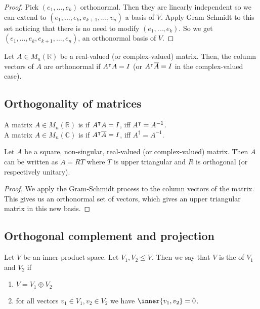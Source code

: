 \begin{proof}
	Pick $(e_1, \dots, e_k)$ orthonormal.
	Then they are linearly independent so we can extend to $(e_1, \dots, e_k, v_{k+1}, \dots, v_n)$ a basis of $V$.
	Apply Gram Schmidt to this set noticing that there is no need to modify $(e_1, \dots, e_k)$.
	So we get $(e_1, \dots, e_k, e_{k+1}, \dots, e_n)$, an orthonormal basis of $V$.
\end{proof} 

\begin{remark}
	Let $A \in M_n(\mathbb R)$ be a real-valued (or complex-valued) matrix.
	Then, the column vectors of $A$ are orthonormal if $A^\intercal A = I$ (or $A^\intercal \overline A = I$ in the complex-valued case).
\end{remark}

\subsection{Orthogonality of matrices}
\begin{definition}
	A matrix $A \in M_n(\mathbb R)$ is  if $A^\intercal A = I$, iff $A^\intercal = A^{-1}$. \\
	A matrix $A \in M_n(\mathbb C)$ is  if $A^\intercal \overline A = I$, iff $A^\dagger = A^{-1}$.
\end{definition}

\begin{proposition}
	Let $A$ be a square, non-singular, real-valued (or complex-valued) matrix.
	Then $A$ can be written as $A = RT$ where $T$ is upper triangular and $R$ is orthogonal (or respectively unitary).
\end{proposition}

\begin{proof}
	We apply the Gram-Schmidt process to the column vectors of the matrix.
	This gives us an orthonormal set of vectors, which gives an upper triangular matrix in this new basis.
\end{proof}

\subsection{Orthogonal complement and projection}
\begin{definition}
	Let $V$ be an inner product space.
	Let $V_1, V_2 \leq V$.
	Then we say that $V$ is the  of $V_1$ and $V_2$ if 
	\begin{enumerate}
		\item $V = V_1 \oplus V_2$
		\item for all vectors $v_1\in V_1, v_2\in V_2$ we have $\inner{v_1, v_2} = 0$.
	\end{enumerate} 
\end{definition}

